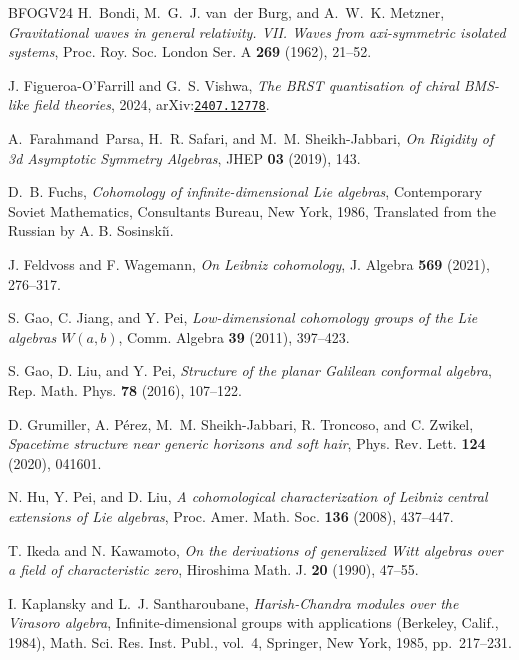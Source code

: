 \documentclass[11pt, svgnames]{amsart}
\theoremstyle{definition}
\newcommand{\etalchar}[1]{$^{#1}$}
\begin{document}
\begin{thebibliography}{BFOGV24}
H.~Bondi, M.~G.~J. van~der Burg, and A.~W.~K. Metzner, \emph{Gravitational
  waves in general relativity. {VII}. {W}aves from axi-symmetric isolated
  systems}, Proc. Roy. Soc. London Ser. A \textbf{269} (1962), 21--52.

J. Figueroa-O'Farrill and G.~S. Vishwa, \emph{The {BRST} quantisation
  of chiral {BMS}-like field theories}, 2024,
  arXiv:\texttt{\href{https://arxiv.org/abs/2407.12778}{2407.12778}}.

A.~Farahmand~Parsa, H.~R. Safari, and M.~M. Sheikh-Jabbari, \emph{{On Rigidity
  of 3d Asymptotic Symmetry Algebras}}, JHEP \textbf{03} (2019), 143.

D.~B. Fuchs, \emph{Cohomology of infinite-dimensional {L}ie algebras},
  Contemporary Soviet Mathematics, Consultants Bureau, New York, 1986,
  Translated from the Russian by A. B. Sosinski\u{\i}.

J. Feldvoss and F. Wagemann, \emph{On {L}eibniz cohomology}, J.
  Algebra \textbf{569} (2021), 276--317.

S. Gao, C. Jiang, and Y. Pei, \emph{Low-dimensional cohomology
  groups of the {L}ie algebras {$W(a,b)$}}, Comm. Algebra \textbf{39} (2011), 397--423.

S. Gao, D. Liu, and Y. Pei, \emph{Structure of the planar {G}alilean
  conformal algebra}, Rep. Math. Phys. \textbf{78} (2016), 107--122.

\bibitem[GPSJ{\etalchar{+}}20]{GPSJTZ}
D. Grumiller, A. P\'erez, M.~M. Sheikh-Jabbari, R. Troncoso, and
  C. Zwikel, \emph{{Spacetime structure near generic horizons and soft
  hair}}, Phys. Rev. Lett. \textbf{124} (2020), 041601.

N. Hu, Y. Pei, and D. Liu, \emph{A cohomological characterization of
  {L}eibniz central extensions of {L}ie algebras}, Proc. Amer. Math. Soc.
  \textbf{136} (2008), 437--447.

T. Ikeda and N. Kawamoto, \emph{On the derivations of generalized
  {W}itt algebras over a field of characteristic zero}, Hiroshima Math. J.
  \textbf{20} (1990), 47--55.

I. Kaplansky and L.~J. Santharoubane, \emph{Harish-{C}handra modules over
  the {V}irasoro algebra}, Infinite-dimensional groups with applications
  ({B}erkeley, {C}alif., 1984), Math. Sci. Res. Inst. Publ., vol.~4, Springer,
  New York, 1985, pp.~217--231.


\end{thebibliography}
\end{document}
